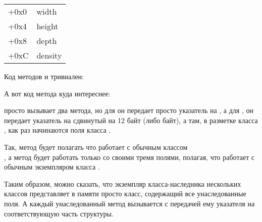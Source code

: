 \begin{center}
\begin{tabular}{ | l | l | }
\hline
  \tableheader{} \\
\hline
  +0x0 & width \\
\hline
  +0x4 & height \\
\hline
  +0x8 & depth \\
\hline
  +0xC & density \\
\hline
\end{tabular}
\end{center}

Код методов  и  тривиален:






А вот код метода  куда интереснее:




 просто вызывает два метода, но для  он передает просто указатель на , а для , он передает указатель на  сдвинутый на 12 байт (либо  байт), а там, 
в разметке класса , как раз начинаются поля класса .


Так, метод  будет полагать что работает с обычным классом \\
, а метод  будет работать только со своими тремя полями, полагая, 
что работает с обычным экземпляром класса .


Таким образом, можно сказать, что экземпляр класса-наследника нескольких классов представляет в памяти просто 
 класс, содержащий все унаследованные поля. А каждый унаследованный метод вызывается с передачей
ему указателя на соответствующую часть структуры.


